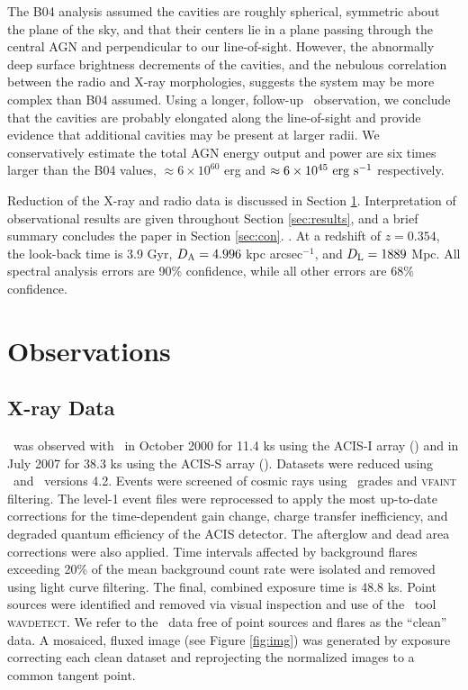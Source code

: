 \documentclass[apjpt4]{aastex}
\begin{document}
The B04 analysis assumed the cavities are roughly spherical, symmetric
about the plane of the sky, and that their centers lie in a plane
passing through the central AGN and perpendicular to our
line-of-sight. However, the abnormally deep surface brightness
decrements of the cavities, and the nebulous correlation between the
radio and X-ray morphologies, suggests the system may be more complex
than B04 assumed. Using a longer, follow-up \cxo\ observation, we
conclude that the cavities are probably elongated along the
line-of-sight and provide evidence that additional cavities may be
present at larger radii. We conservatively estimate the total AGN
energy output and power are six times larger than the B04 values,
$\approx 6 \times 10^{60}$ erg and $\approx 6 \times 10^{45} ~\rm{\mbox{\ensuremath{\rm{erg}}}~\ensuremath{\rm{\mbox{\ensuremath{\rm{s}}}^{-1}}}}$
respectively.

Reduction of the X-ray and radio data is discussed in Section
\ref{sec:obs}. Interpretation of observational results are given
throughout Section \ref{sec:results}, and a brief summary concludes
the paper in Section \ref{sec:con}. \LCDM. At a redshift of $z =
0.354$, the look-back time is 3.9 Gyr, $D_{\rm{A}} = 4.996$ kpc
arcsec$^{-1}$, and $D_{\rm{L}} = 1889$ Mpc. All spectral analysis errors are
90\% confidence, while all other errors are 68\% confidence.

\section{Observations}
\label{sec:obs}

\subsection{X-ray Data}
\label{sec:xray}

\rbs\ was observed with \cxo\ in October 2000 for 11.4 ks using the
ACIS-I array () and in
July 2007 for 38.3 ks using the ACIS-S array (). Datasets were reduced using
\ciao\ and \caldb\ versions 4.2. Events were screened of cosmic rays
using \asca\ grades and {\textsc{vfaint}} filtering. The level-1 event
files were reprocessed to apply the most up-to-date corrections for
the time-dependent gain change, charge transfer inefficiency, and
degraded quantum efficiency of the ACIS detector. The afterglow and
dead area corrections were also applied. Time intervals affected by
background flares exceeding 20\% of the mean background count rate
were isolated and removed using light curve filtering. The final,
combined exposure time is 48.8 ks. Point sources were identified and
removed via visual inspection and use of the \ciao\ tool
{\textsc{wavdetect}}. We refer to the \cxo\ data free of point sources
and flares as the ``clean'' data. A mosaiced, fluxed image (see Figure
\ref{fig:img}) was generated by exposure correcting each clean dataset
and reprojecting the normalized images to a common tangent point.
\end{document}
